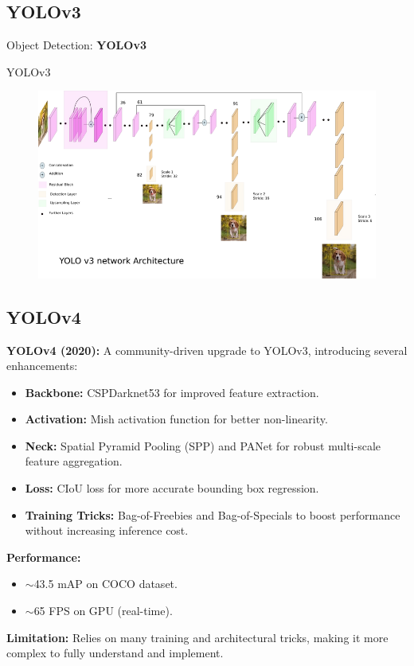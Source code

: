 \subsection{YOLOv3}
\begin{frame}{}
    \LARGE Object Detection: \textbf{YOLOv3}
\end{frame}

\begin{frame}[allowframebreaks]{YOLOv3}
    \begin{figure}
        \centering
        \includegraphics[width=1.0\textwidth,height=0.85\textheight,keepaspectratio]{images/object-detect/yolo-v3.png}
    \end{figure}
\framebreak
    \subsection{YOLOv4}
    \textbf{YOLOv4 (2020):} A community-driven upgrade to YOLOv3, introducing several enhancements:
    \begin{itemize}
        \item \textbf{Backbone:} CSPDarknet53 for improved feature extraction.
        \item \textbf{Activation:} Mish activation function for better non-linearity.
        \item \textbf{Neck:} Spatial Pyramid Pooling (SPP) and PANet for robust multi-scale feature aggregation.
        \item \textbf{Loss:} CIoU loss for more accurate bounding box regression.
        \item \textbf{Training Tricks:} Bag-of-Freebies and Bag-of-Specials to boost performance without increasing inference cost.
    \end{itemize}
\framebreak
    \textbf{Performance:}
    \begin{itemize}
        \item $\sim$43.5 mAP on COCO dataset.
        \item $\sim$65 FPS on GPU (real-time).
    \end{itemize}
    \textbf{Limitation:} Relies on many training and architectural tricks, making it more complex to fully understand and implement.
\end{frame}
